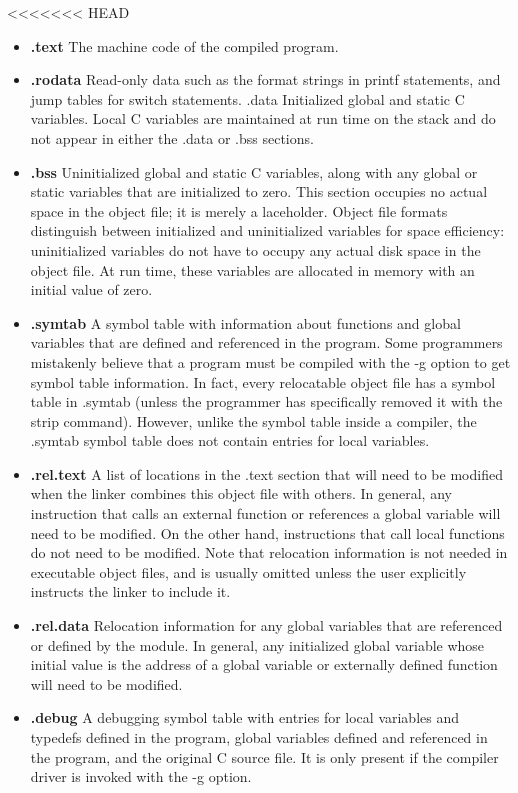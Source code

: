 <<<<<<< HEAD
\begin{itemize}
    \item \textbf{.text} The machine code of the compiled program.
    \item \textbf{.rodata} Read-only data such as the format strings in printf statements, and jump tables for switch statements.
    .data Initialized global and static C variables. Local C variables are maintained at run time on the stack and do not appear in either the .data or .bss sections.
    \item \textbf{.bss} Uninitialized global and static C variables, along with any global or static variables that are initialized to zero. This section occupies no actual space in the object file; it is merely a laceholder. Object file formats distinguish between initialized and uninitialized variables for space efficiency: uninitialized variables do not have to occupy any actual disk space in the object file. At run time, these variables are allocated in memory with an initial value of zero.
    \item \textbf{.symtab} A symbol table with information about functions and global variables
    that are defined and referenced in the program. Some programmers mistakenly believe that a program must be compiled with the -g option to
    get symbol table information. In fact, every relocatable object file has
    a symbol table in .symtab (unless the programmer has specifically removed it with the strip command). However, unlike the symbol table
    inside a compiler, the .symtab symbol table does not contain entries for
    local variables.
    \item \textbf{.rel.text} A list of locations in the .text section that will need to be modified
    when the linker combines this object file with others. In general, any
    instruction that calls an external function or references a global variable will need to be modified. On the other hand, instructions that call local functions do not need to be modified. Note that relocation information is not needed in executable object files, and is usually omitted unless the user explicitly instructs the linker to include it.
    \item \textbf{.rel.data} Relocation information for any global variables that are referenced or defined by the module. In general, any initialized global variable whose initial value is the address of a global variable or externally defined function will need to be modified.
    \item \textbf{.debug} A debugging symbol table with entries for local variables and typedefs defined in the program, global variables defined and referenced in the program, and the original C source file. It is only present if the compiler driver is invoked with the -g option.

\end{itemize}
